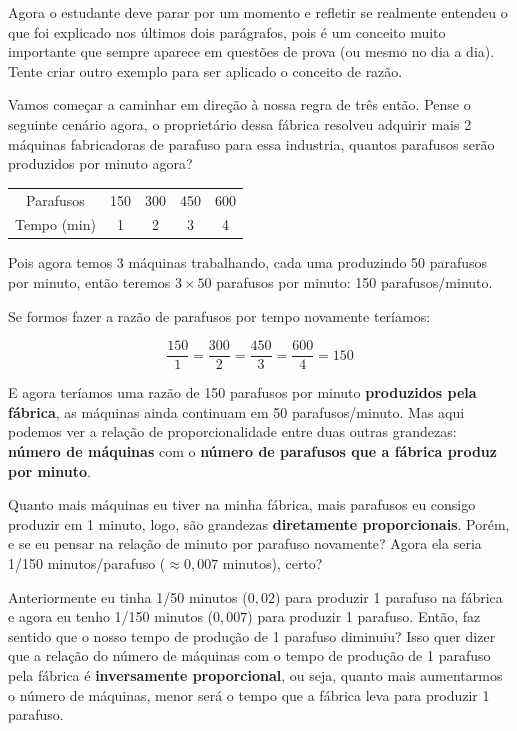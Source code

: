 \begin{tcolorbox}[title=IMPORTANTE]
    Agora o estudante deve parar por um momento e refletir se realmente entendeu o que foi explicado nos últimos dois parágrafos, pois é um conceito muito importante que sempre aparece em questões de prova (ou mesmo no dia a dia). Tente criar outro exemplo para ser aplicado o conceito de razão.
\end{tcolorbox}

Vamos começar a caminhar em direção à nossa regra de três então. Pense o seguinte cenário agora, o proprietário dessa fábrica resolveu adquirir mais 2 máquinas fabricadoras de parafuso para essa industria, quantos parafusos serão produzidos por minuto agora?

\begin{table}[H]
        \centering
        \begin{tabular}{ccccc}
            Parafusos & 150 & 300 & 450 & 600\\
            Tempo (min) & 1 & 2 & 3 & 4\\
        \end{tabular}
        \label{tab:fabrica_parafusos_2}
    \end{table}

Pois agora temos 3 máquinas trabalhando, cada uma produzindo 50 parafusos por minuto, então teremos \(3\times50\) parafusos por minuto: 150 parafusos/minuto.

Se formos fazer a razão de parafusos por tempo novamente teríamos:

\begin{equation}
    \frac{150}{1}=\frac{300}{2}=\frac{450}{3}=\frac{600}{4}=150
\end{equation}

E agora teríamos uma razão de 150 parafusos por minuto \textbf{produzidos pela fábrica}, as máquinas ainda continuam em 50 parafusos/minuto. Mas aqui podemos ver a relação de proporcionalidade entre duas outras grandezas: \textbf{número de máquinas} com o \textbf{número de parafusos que a fábrica produz por minuto}.

Quanto mais máquinas eu tiver na minha fábrica, mais parafusos eu consigo produzir em 1 minuto, logo, são grandezas \textbf{diretamente proporcionais}. Porém, e se eu pensar na relação de minuto por parafuso novamente? Agora ela seria 1/150 minutos/parafuso (\(\approx 0,007\) minutos), certo?

Anteriormente eu tinha 1/50 minutos (\(0,02\)) para produzir 1 parafuso na fábrica e agora eu tenho 1/150 minutos (\(0,007\)) para produzir 1 parafuso. Então, faz sentido que o nosso tempo de produção de 1 parafuso diminuiu? Isso quer dizer que a relação do número de máquinas com o tempo de produção de 1 parafuso pela fábrica é \textbf{inversamente proporcional}, ou seja, quanto mais aumentarmos o número de máquinas, menor será o tempo que a fábrica leva para produzir 1 parafuso.

